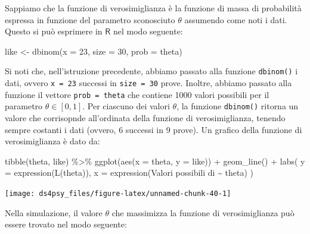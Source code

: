 \documentclass[
  11pt,
]{krantz}
\makeatletter
\newenvironment{Shaded}{\begin{snugshade}}{\end{snugshade}}
\newcommand{\AttributeTok}[1]{\textcolor[rgb]{0.61,0.61,0.61}{#1}}
\newcommand{\DecValTok}[1]{\textcolor[rgb]{0.06,0.06,0.06}{#1}}
\newcommand{\FunctionTok}[1]{\textcolor[rgb]{0,0,0}{#1}}
\newcommand{\NormalTok}[1]{#1}
\newcommand{\OtherTok}[1]{\textcolor[rgb]{0.37,0.37,0.37}{#1}}
\newcommand{\SpecialCharTok}[1]{\textcolor[rgb]{0,0,0}{#1}}
\newcommand{\StringTok}[1]{\textcolor[rgb]{0.5,0.5,0.5}{#1}}
\newenvironment{kframe}{%
\medskip{}
\setlength{\fboxsep}{.8em}
 \def\at@end@of@kframe{}%
 \ifinner\ifhmode%
  \def\at@end@of@kframe{\end{minipage}}%
  \begin{minipage}{\columnwidth}%
 \fi\fi%
 \def\FrameCommand##1{\hskip\@totalleftmargin \hskip-\fboxsep
 \colorbox{shadecolor}{##1}\hskip-\fboxsep
     \hskip-\linewidth \hskip-\@totalleftmargin \hskip\columnwidth}%
 \MakeFramed {\advance\hsize-\width
   \@totalleftmargin\z@ \linewidth\hsize
   \@setminipage}}%
 {\par\unskip\endMakeFramed%
 \at@end@of@kframe}
\renewenvironment{Shaded}{\begin{kframe}}{\end{kframe}}
\newcommand{\R}{\textsf{R}} %
\theoremstyle{definition}
\theoremstyle{definition}
\theoremstyle{definition}
\theoremstyle{definition}
\theoremstyle{remark}
\makeatother
\begin{document}
Sappiamo che la funzione di verosimiglianza è la funzione di massa di probabilità espressa in funzione del parametro sconosciuto \(\theta\) assumendo come noti i dati. Questo si può esprimere in \(\R\) nel modo seguente:

\begin{Shaded}
\begin{Highlighting}[]
\NormalTok{like }\OtherTok{\textless{}{-}} \FunctionTok{dbinom}\NormalTok{(}\AttributeTok{x =} \DecValTok{23}\NormalTok{, }\AttributeTok{size =} \DecValTok{30}\NormalTok{, }\AttributeTok{prob =}\NormalTok{ theta)}
\end{Highlighting}
\end{Shaded}

Si noti che, nell'istruzione precedente, abbiamo passato alla funzione \texttt{dbinom()} i dati, ovvero \texttt{x\ =\ 23} successi in \texttt{size\ =\ 30} prove. Inoltre, abbiamo passato alla funzione il vettore \texttt{prob\ =\ theta} che contiene 1000 valori possibili per il parametro \(\theta \in [0, 1]\). Per ciascuno dei valori \(\theta\), la funzione \texttt{dbinom()} ritorna un valore che corrisopnde all'ordinata della funzione di verosimiglianza, tenendo sempre costanti i dati (ovvero, 6 successi in 9 prove). Un grafico della funzione di verosimiglianza è dato da:

\begin{Shaded}
\begin{Highlighting}[]
\FunctionTok{tibble}\NormalTok{(theta, like) }\SpecialCharTok{\%\textgreater{}\%} 
  \FunctionTok{ggplot}\NormalTok{(}\FunctionTok{aes}\NormalTok{(}\AttributeTok{x =}\NormalTok{ theta, }\AttributeTok{y =}\NormalTok{ like)) }\SpecialCharTok{+}
  \FunctionTok{geom\_line}\NormalTok{() }\SpecialCharTok{+}
  \FunctionTok{labs}\NormalTok{(}
    \AttributeTok{y =} \FunctionTok{expression}\NormalTok{(}\FunctionTok{L}\NormalTok{(theta)),}
    \AttributeTok{x =} \FunctionTok{expression}\NormalTok{(}\StringTok{\textquotesingle{}Valori possibili di\textquotesingle{}} \SpecialCharTok{\textasciitilde{}}\NormalTok{ theta)}
\NormalTok{  )}
\end{Highlighting}
\end{Shaded}

\begin{center}\texttt{[image: ds4psy\_files/figure-latex/unnamed-chunk-40-1]} \end{center}

Nella simulazione, il valore \(\theta\) che massimizza la funzione di verosimiglianza può essere trovato nel modo seguente:
\end{document}
